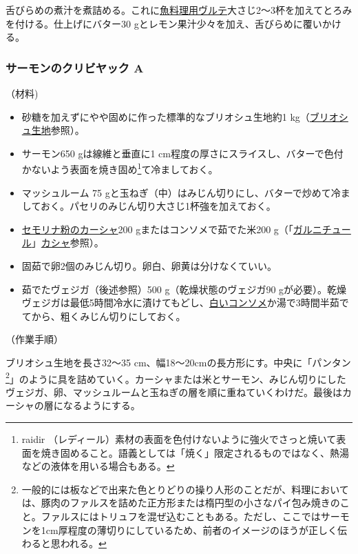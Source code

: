 \begin{recette}
舌びらめの煮汁を煮詰める。これに\protect\hyperlink{veloute-de-poisson}{魚料理用ヴルテ}大さじ2〜3杯を加えてとろみを付ける。仕上げにバター30
gとレモン果汁少々を加え、舌びらめに覆いかける。

\hypertarget{coulibiac-de-saumon-a}{%
\subsubsection{サーモンのクリビヤック A}\label{coulibiac-de-saumon-a}}



（材料)

\begin{itemize}
\item
  砂糖を加えずにやや固めに作った標準的なブリオシュ生地約1
  kg（\protect\hyperlink{pate-a-brioche}{ブリオシュ生地}参照）。
\item
  サーモン650 gは線維と垂直に1
  cm程度の厚さにスライスし、バターで色付かないよう表面を焼き固め\footnote{raidir
    （レディール）素材の表面を色付けないように強火でさっと焼いて表面を焼き固めること。語義としては「焼く」限定されるものではなく、熱湯などの液体を用いる場合もある。}て冷ましておく。
\item
  マッシュルーム 75
  gと玉ねぎ（中）はみじん切りにし、バターで炒めて冷ましておく。パセリのみじん切り大さじ1杯強を加えておく。
\item
  \protect\hyperlink{kache-de-semoule-pour-coulibiac}{セモリナ粉のカーシャ}200
  gまたはコンソメで茹でた米200
  g（「\protect\hyperlink{garnitures}{ガルニチュール}」\protect\hyperlink{kache-de-semoule-pour-coulibiac}{カシャ}参照）。
\item
  固茹で卵2個のみじん切り。卵白、卵黄は分けなくていい。
\item
  茹でたヴェジガ（後述参照）500 g（乾燥状態のヴェジガ90
  gが必要）。乾燥ヴェジガは最低5時間冷水に漬けてもどし、\protect\hyperlink{consomme-blanc-simple}{白いコンソメ}か湯で3時間半茹でてから、粗くみじん切りにしておく。
\end{itemize}

（作業手順）

ブリオシュ生地を長さ32〜35
cm、幅18〜20cmの長方形にす。中央に「パンタン\footnote{一般的には板などで出来た色とりどりの操り人形のことだが、料理においては、豚肉のファルスを詰めた正方形または楕円型の小さなパイ包み焼きのこと。ファルスにはトリュフを混ぜ込むこともある。ただし、ここではサーモンを1cm厚程度の薄切りにしているため、前者のイメージのほうが正しく伝わると思われる。}」のように具を詰めていく。カーシャまたは米とサーモン、みじん切りにしたヴェジガ、卵、マッシュルームと玉ねぎの層を順に重ねていくわけだ。最後はカーシャの層になるようにする。


\end{recette}
